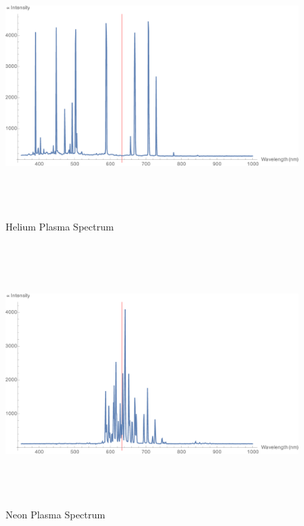 \documentclass[a4paper]{scrartcl}
\begin{document}
\begin{figure}
    \centering
    \includegraphics[height = 10cm]{Q2/Helium Plasma.png}
    \caption{Helium Plasma Spectrum}
    \label{fig:he-plasma}
\end{figure}
\begin{figure}
    \centering
    \includegraphics[height = 10cm]{Q2/Neon Plasma.png}
    \caption{Neon Plasma Spectrum}
    \label{fig:ne-plasma}
\end{figure}
\end{document}

